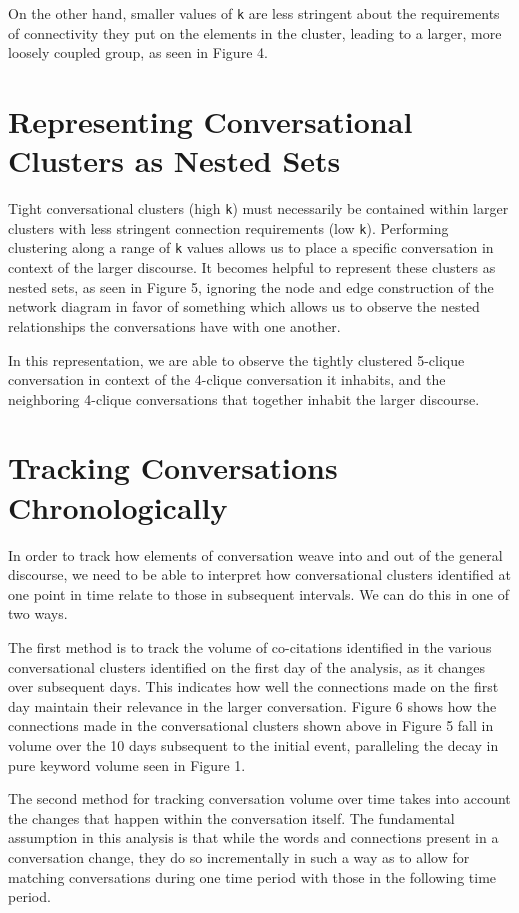 \documentclass[12pt]{article}
\begin{document}
On the other hand, smaller values of \texttt{k} are less stringent about the requirements of connectivity they put on the elements in the cluster, leading to a larger, more loosely coupled group, as seen in Figure 4.

\section{Representing Conversational Clusters as Nested Sets}
Tight conversational clusters (high \texttt{k}) must necessarily be contained within larger clusters with less stringent connection requirements (low \texttt{k}). Performing clustering along a range of \texttt{k} values allows us to place a specific conversation in context of the larger discourse. 
It becomes helpful to represent these clusters as nested sets, as seen in Figure 5, ignoring the node and edge construction of the network diagram in favor of something which allows us to observe the nested relationships the conversations have with one another.
 
In this representation, we are able to observe the tightly clustered 5-clique conversation in context of the 4-clique conversation it inhabits, and the neighboring 4-clique conversations that together inhabit the larger discourse.

\section{Tracking Conversations Chronologically}
In order to track how elements of conversation weave into and out of the general discourse, we need to be able to interpret how conversational clusters identified at one point in time relate to those in subsequent intervals. We can do this in one of two ways. 

The first method is to track the volume of co-citations identified in the various conversational clusters identified on the first day of the analysis, as it changes over subsequent days. This indicates how well the connections made on the first day maintain their relevance in the larger conversation. Figure 6 shows how the connections made in the conversational clusters shown above in Figure 5 fall in volume over the 10 days subsequent to the initial event, paralleling the decay in pure keyword volume seen in Figure 1.

The second method for tracking conversation volume over time takes into account the changes that happen within the conversation itself. The fundamental assumption in this analysis is that while the words and connections present in a conversation change, they do so incrementally in such a way as to allow for matching conversations during one time period with those in the following time period. 
\end{document}
